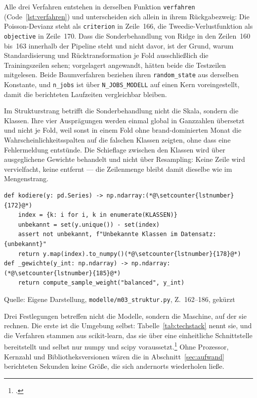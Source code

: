 \documentclass[12pt,a4paper]{article}
\newcommand{\tabquelle}[1][Eigene Darstellung]{%
  \par\setlength{\parskip}{0pt}\vspace{3pt}%
  {\setstretch{1}\fontsize{9pt}{11pt}\selectfont\raggedright Quelle: #1\par}%
}
\begin{document}
Alle drei Verfahren entstehen in derselben Funktion \texttt{verfahren} (Code~\ref{lst:verfahren}) und unterscheiden sich allein in ihrem Rückgabezweig: Die Poisson-Devianz steht als \texttt{criterion} in Zeile~166, die Tweedie-Verlustfunktion als \texttt{objective} in Zeile~170. Dass die Sonderbehandlung von Ridge in den Zeilen~160 bis~163 innerhalb der Pipeline steht und nicht davor, ist der Grund, warum Standardisierung und Rücktransformation je Fold ausschließlich die Trainingszeilen sehen; vorgelagert angewandt, hätten beide die Testzeilen mitgelesen. Beide Baumverfahren beziehen ihren \texttt{random\_state} aus derselben Konstante, und \texttt{n\_jobs} ist über \texttt{N\_JOBS\_MODELL} auf einen Kern voreingestellt, damit die berichteten Laufzeiten vergleichbar bleiben.


Im Strukturstrang betrifft die Sonderbehandlung nicht die Skala, sondern die
Klassen. Ihre vier Ausprägungen werden einmal global in Ganzzahlen übersetzt
und nicht je Fold, weil sonst in einem Fold ohne brand-dominierten Monat die
Wahrscheinlichkeitsspalten auf die falschen Klassen zeigten, ohne dass eine
Fehlermeldung entstünde. Die Schieflage zwischen den Klassen wird über
ausgeglichene Gewichte behandelt und nicht über Resampling: Keine Zeile wird
vervielfacht, keine entfernt --- die Zeilenmenge bleibt damit dieselbe wie im
Mengenstrang.

\begin{quellcode}[htbp]
\caption{Globale Klassenkodierung und ausgeglichene Gewichte}
\label{lst:kodiere}\vspace{-3.5pt}
\begin{lstlisting}[style=pythonstil,firstnumber=162]
def kodiere(y: pd.Series) -> np.ndarray:(*@\setcounter{lstnumber}{172}@*)
    index = {k: i for i, k in enumerate(KLASSEN)}
    unbekannt = set(y.unique()) - set(index)
    assert not unbekannt, f"Unbekannte Klassen im Datensatz: {unbekannt}"
    return y.map(index).to_numpy()(*@\setcounter{lstnumber}{178}@*)
def _gewichte(y_int: np.ndarray) -> np.ndarray:(*@\setcounter{lstnumber}{185}@*)
    return compute_sample_weight("balanced", y_int)
\end{lstlisting}
\tabquelle[Eigene Darstellung, \texttt{modelle/m03\_struktur.py}, Z.~162--186, gekürzt]
\end{quellcode}

Drei Festlegungen betreffen nicht die Modelle, sondern die Maschine, auf der
sie rechnen. Die erste ist die Umgebung selbst: Tabelle~\ref{tab:techstack}
nennt sie, und die Verfahren stammen aus scikit-learn, das sie über eine
einheitliche Schnittstelle bereitstellt und selbst nur numpy und scipy
voraussetzt.\footcite[2826]{Pedregosa2011} Ohne Prozessor, Kernzahl und
Bibliotheksversionen wären die in Abschnitt~\ref{sec:aufwand} berichteten
Sekunden keine Größe, die sich andernorts wiederholen ließe.
\end{document}
